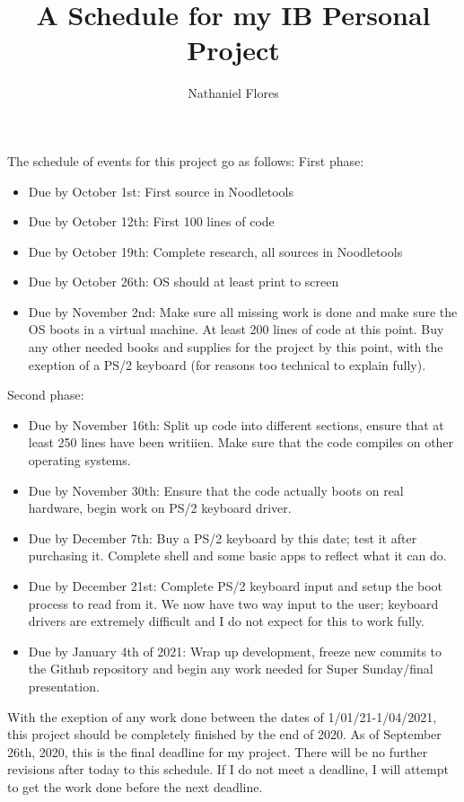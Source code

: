 \documentclass[a4paper,10pt]{article}
\title{A Schedule for my IB Personal Project}
\author{Nathaniel Flores}
\begin{document}
\maketitle
The schedule of events for this project go as follows:
\newline
\newline
First phase:
\begin{itemize}
 \item Due by October 1st: First source in Noodletools
 \item Due by October 12th: First 100 lines of code
 \item Due by October 19th: Complete research, all sources in Noodletools
 \item Due by October 26th: OS should at least print to screen
 \item Due by November 2nd: Make sure all missing work is done and make sure the OS boots in a virtual machine. At least 200 lines of code at this point. Buy any other needed books and supplies for the project by this point, with the exeption of a PS/2 keyboard (for reasons too technical to explain fully).
\end{itemize}
Second phase:
\begin{itemize}
 \item Due by November 16th: Split up code into different sections, ensure that at least 250 lines have been writiien. Make sure that the code compiles on other operating systems.
 \item Due by November 30th: Ensure that the code actually boots on real hardware, begin work on PS/2 keyboard driver.
 \item Due by December 7th: Buy a PS/2 keyboard by this date; test it after purchasing it. Complete shell and some basic apps to reflect what it can do.
 \item Due by December 21st: Complete PS/2 keyboard input and setup the boot process to read from it. We now have two way input to the user; keyboard drivers are extremely difficult and I do not expect for this to work fully.
 \item Due by January 4th of 2021: Wrap up development, freeze new commits to the Github repository and begin any work needed for Super Sunday/final presentation.
\end{itemize}
With the exeption of any work done between the dates of 1/01/21-1/04/2021, this project should be completely finished by the end of 2020. As of September 26th, 2020, this is the final deadline for my project. There will be no further revisions after today to this schedule. If I do not meet a deadline, I will attempt to get the work done before the next deadline.
\end{document}

